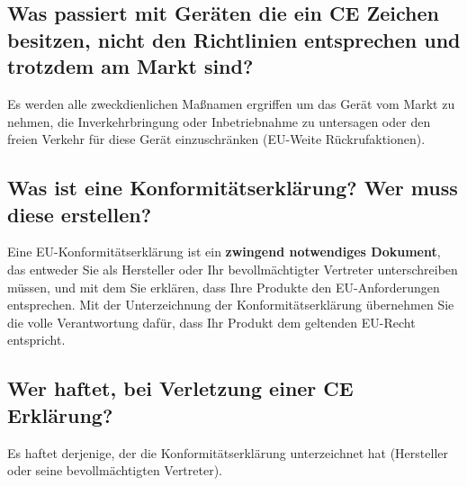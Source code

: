 \subsection{Was passiert mit Geräten die ein CE Zeichen besitzen, nicht den Richtlinien entsprechen und trotzdem am Markt sind?}
Es werden alle zweckdienlichen Maßnamen ergriffen um das Gerät vom Markt zu nehmen, die Inverkehrbringung oder Inbetriebnahme zu untersagen oder den freien Verkehr für diese Gerät einzuschränken (EU-Weite Rückrufaktionen).

\subsection{Was ist eine Konformitätserklärung? Wer muss diese erstellen?}
Eine EU-Konformitätserklärung ist ein \textbf{zwingend notwendiges Dokument}, das entweder Sie als Hersteller oder Ihr bevollmächtigter Vertreter unterschreiben müssen, und mit dem Sie erklären, dass Ihre Produkte den EU-Anforderungen entsprechen. Mit der Unterzeichnung der Konformitätserklärung übernehmen Sie die volle Verantwortung dafür, dass Ihr Produkt dem geltenden EU-Recht entspricht.

\subsection{Wer haftet, bei Verletzung einer CE Erklärung?}
Es haftet derjenige, der die Konformitätserklärung unterzeichnet hat (Hersteller oder seine bevollmächtigten Vertreter).

\pagebreak